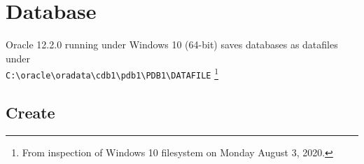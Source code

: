 
\newpage
\setcounter{secnumdepth}{0}

\section{Database}

Oracle 12.2.0 running under Windows 10 (64-bit) saves databases as
datafiles under\\
 \texttt{C:\textbackslash oracle\textbackslash oradata\textbackslash cdb1\textbackslash pdb1\textbackslash PDB1\textbackslash DATAFILE}
\footnote{From inspection of Windows 10 filesystem on Monday August 3, 2020.}

\subsection{Create}
